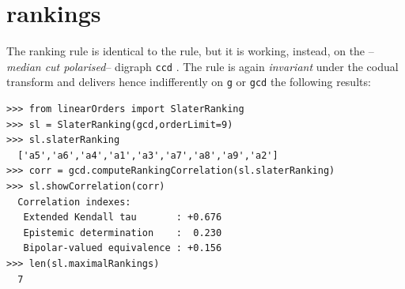 \section{\Slater rankings}
\label{sec:8.5}

The \Slater ranking rule is identical to the \Kemeny rule, but it is working, instead, on the \Condorcet --\emph{median cut polarised}-- digraph \texttt{ccd} \citep{SLA-1961}. The \Slater rule is again \emph{invariant} under the codual transform and delivers hence indifferently on \texttt{g} or \texttt{gcd} the following results:
\begin{lstlisting}[caption={Computing a \Slater ranking},label=list:8.11]   
>>> from linearOrders import SlaterRanking
>>> sl = SlaterRanking(gcd,orderLimit=9)
>>> sl.slaterRanking
  ['a5','a6','a4','a1','a3','a7','a8','a9','a2']
>>> corr = gcd.computeRankingCorrelation(sl.slaterRanking)
>>> sl.showCorrelation(corr)
  Correlation indexes:
   Extended Kendall tau       : +0.676
   Epistemic determination    :  0.230
   Bipolar-valued equivalence : +0.156
>>> len(sl.maximalRankings)
  7
\end{lstlisting}


